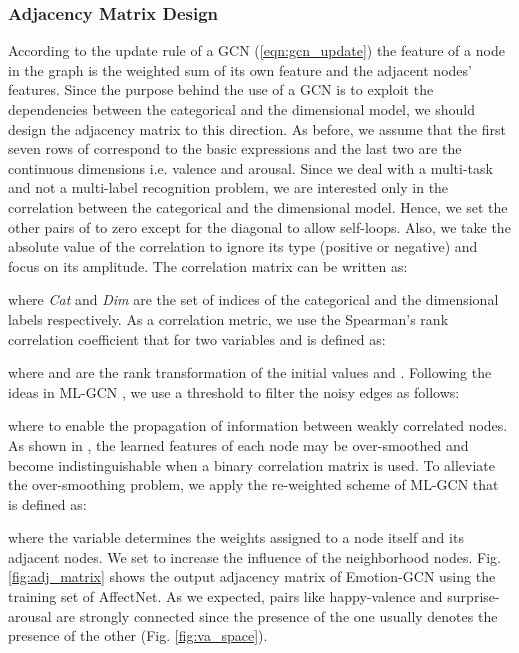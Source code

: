 \documentclass[a4paper, 10pt, conference]{ieeeconf}      \usepackage{FG2021}
\begin{document}
\subsubsection{Adjacency Matrix Design}

According to the update rule of a GCN (\ref{eqn:gcn_update}) the feature of a node in the graph is the weighted sum of its own feature and the adjacent nodes’ features. Since the purpose behind the use of a GCN is to exploit the dependencies between the categorical and the dimensional model, we should design the adjacency matrix  to this direction. As before, we assume that the first seven rows of  correspond to the basic expressions and the last two are the continuous dimensions i.e. valence and arousal. Since we deal with a multi-task and not a multi-label recognition problem, we are interested only in the correlation between the categorical and the dimensional model. Hence, we set the other pairs of  to zero except for the diagonal to allow self-loops. Also, we take the absolute value of the correlation to ignore its type (positive or negative) and focus on its amplitude. The correlation matrix  can be written as:


where \textit{Cat} and \textit{Dim} are the set of indices of the categorical and the dimensional labels respectively. As a correlation metric, we use the Spearman's rank correlation coefficient \cite{spearman1961proof} that for two variables  and  is defined as:


where  and  are the rank transformation of the initial values  and . Following the ideas in ML-GCN \cite{chen2019multi}, we use a threshold  to filter the noisy edges as follows:


where  to enable the propagation of information between weakly correlated nodes. As shown in \cite{li2018deeper}, the learned features of each node may be over-smoothed and become indistinguishable when a binary correlation matrix is used. To alleviate the over-smoothing problem, we apply the re-weighted scheme of ML-GCN that is defined as: 


where the variable  determines the weights assigned to a node itself and its adjacent nodes. We set  to increase the influence of the neighborhood nodes. Fig. \ref{fig:adj_matrix} shows the output adjacency matrix  of Emotion-GCN using the training set of AffectNet. As we expected, pairs like happy-valence and surprise-arousal are strongly connected since the presence of the one usually denotes the presence of the other (Fig. \ref{fig:va_space}).
\end{document}

